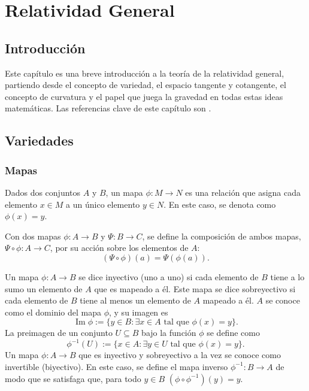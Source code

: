 \chapter{Relatividad General}
\section{Introducción}
Este capítulo es una breve introducción a la teoría de la relatividad general, partiendo desde el concepto de variedad, el espacio tangente y cotangente, el concepto de curvatura y el papel que juega la gravedad en todas estas ideas matemáticas. Las referencias clave de este capítulo son \cite{Carroll,Munkres}.
\section{Variedades}
\subsection{Mapas}
\begin{defi}[Mapa]
	Dados dos conjuntos $A$ y $B$, un mapa $\phi:M\rightarrow N$ es una relación que asigna cada elemento $x\in M$ a un único elemento $y\in N$. En este caso, se denota como $\phi(x)=y$.
\end{defi}
\begin{defi}
	Con dos mapas $\phi:A\rightarrow B$ y $\Psi:B\rightarrow C$, se define la composición de ambos mapas, $\Psi\circ\phi:A\rightarrow C$, por su acción sobre los elementos de $A$:
	$$(\Psi\circ\phi)(a)=\Psi(\phi(a)).$$
\end{defi}
\begin{center}
\end{center}

Un mapa $\phi:A\rightarrow B$ se dice inyectivo (uno a uno) si cada elemento de $B$ tiene a lo sumo un elemento de $A$ que es mapeado a él. Este mapa se dice sobreyectivo si cada elemento de $B$ tiene al menos un elemento de $A$ mapeado a él. $A$ se conoce como el dominio del mapa $\phi$, y su imagen es
$$\mathop{Im}\phi:=\{y\in B: \exists x\in A \text{ tal que }\phi(x)=y\}.$$
La preimagen de un conjunto $U\subseteq B$ bajo la función $\phi$ se define como
$$\phi^{-1}(U):=\{ x\in A: \exists y \in U \text{ tal que }\phi(x)=y\}.$$
Un mapa $\phi:A\rightarrow B$ que es inyectivo y sobreyectivo a la vez se conoce como invertible (biyectivo). En este caso, se define el mapa inverso $\phi^{-1}:B\rightarrow A$ de modo que se satisfaga que, para todo $y\in B$ $(\phi\circ\phi^{-1})(y)=y.$
\begin{center}
\end{center}

